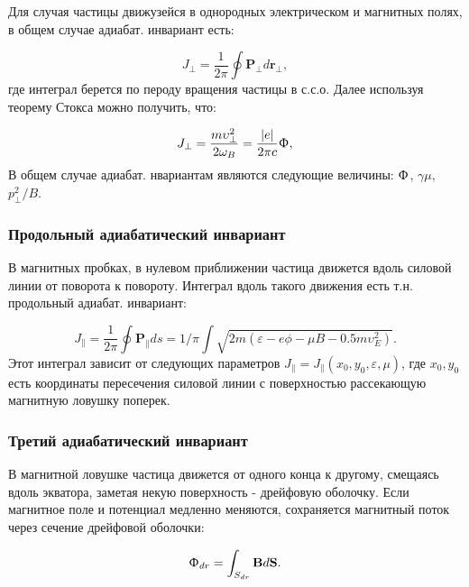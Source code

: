 \documentclass[10pt, a4paper]{article}
\numberwithin{equation}{section}
\begin{document}
Для случая частицы движузейся в однородных электрическом и магнитных полях, в общем случае адиабат. инвариант есть:

\begin{equation}
    \label{eq.4.3pf}
    J_{\perp} = \frac{1}{2\pi} \oint \mathbf{P}_{\perp} d\mathbf{r}_{\perp},
\end{equation}
где интеграл берется по пероду вращения частицы в с.с.о. Далее используя теорему Стокса можно получить, что:

\begin{equation}
    \label{eq.4.3pf}
    J_{\perp} = \frac{m\upsilon_{\perp}^2}{2\omega_B}=\frac{|e|}{2\pi c} \Upphi, 
\end{equation}
В общем случае адиабат. нвариантам являются следующие величины: $\Upphi$, $\gamma \mu$, $p_{\perp}^2/B$.

\subsubsection{Продольный адиабатический инвариант}
\label{sec.4.4.2}
В магнитных пробках, в нулевом приближении частица движется вдоль силовой линии от поворота к повороту. Интеграл вдоль
такого движения есть т.н. продольный адиабат. инвариант:

\begin{equation}
    \label{eq.4.3pf}
    J_{\parallel} = \frac{1}{2\pi}\oint\mathbf{P}_{\parallel}ds=1/\pi \int \sqrt{2m \left(\varepsilon - e\phi - \mu B - 0.5m\upsilon_E^2 \right)}. 
\end{equation}
Этот интеграл зависит от следующих параметров $J_{\parallel}=J_{\parallel}(x_0, y_0, \varepsilon, \mu)$, где $x_0, y_0$
есть координаты пересечения силовой линии с поверхностью рассекающую магнитную ловушку поперек.

\subsubsection{Третий адиабатический инвариант}
\label{sec.4.4.3}

В магнитной ловушке частица движется от одного конца к другому, смещаясь вдоль экватора, заметая некую поверхность - 
дрейфовую оболочку. Если магнитное поле и потенциал медленно меняются, сохраняется магнитный поток через сечение 
дрейфовой оболочки:

\begin{equation}
    \label{eq.4.3pf}
     \Upphi_{dr}= \int_{S_{dr}} \mathbf{B}d\mathbf{S}.
\end{equation}
\end{document}
